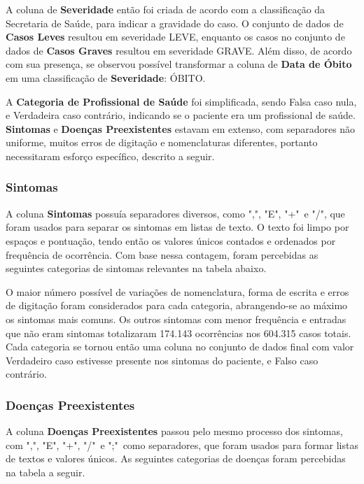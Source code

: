 A coluna de \textbf{Severidade} então foi criada de acordo com a classificação da Secretaria de Saúde, para indicar a gravidade do caso. O conjunto de dados de \textbf{Casos Leves} resultou em severidade LEVE, enquanto os casos no conjunto de dados de \textbf{Casos Graves} resultou em severidade GRAVE. Além disso, de acordo com sua presença, se observou possível transformar a coluna de \textbf{Data de Óbito} em uma classificação de \textbf{Severidade}: ÓBITO.

A \textbf{Categoria de Profissional de Saúde} foi simplificada, sendo Falsa caso nula, e Verdadeira caso contrário, indicando se o paciente era um profissional de saúde. \textbf{Sintomas} e \textbf{Doenças Preexistentes} estavam em extenso, com separadores não uniforme, muitos erros de digitação e nomenclaturas diferentes, portanto necessitaram esforço específico, descrito a seguir.

\subsubsection{Sintomas}
\label{subsubsec:interpretando-sintomas}

A coluna \textbf{Sintomas} possuía separadores diversos, como ",", "E", "+"\ e "/", que foram usados para separar os sintomas em listas de texto. O texto foi limpo por espaços e pontuação, tendo então os valores únicos contados e ordenados por frequência de ocorrência. Com base nessa contagem, foram percebidas as seguintes categorias de sintomas relevantes na tabela abaixo.



O maior número possível de variações de nomenclatura, forma de escrita e erros de digitação foram considerados para cada categoria, abrangendo-se ao máximo os sintomas mais comuns. Os outros sintomas com menor frequência e entradas que não eram sintomas totalizaram 174.143 ocorrências nos 604.315 casos totais. Cada categoria se tornou então uma coluna no conjunto de dados final com valor Verdadeiro caso estivesse presente nos sintomas do paciente, e Falso caso contrário.

\subsubsection{Doenças Preexistentes}
\label{subsubsec:interpretando-doencas}

A coluna \textbf{Doenças Preexistentes} passou pelo mesmo processo dos sintomas, com ",", "E", "+", "/"\ e ";"\ como separadores, que foram usados para formar listas de textos e valores únicos. As seguintes categorias de doenças foram percebidas na tabela a seguir.

